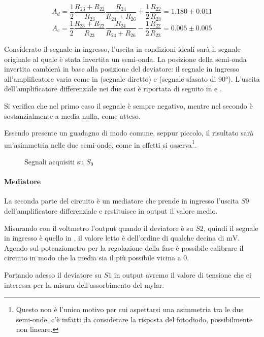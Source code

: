 $$A_d = \frac{1}{2}\frac{R_{23}+R_{22}}{R_{23}}\frac{R_{24}}{R_{24}+R_{26}} + \frac{1}{2}\frac{R_{22}}{R_{23}} = 1.180\pm0.011$$
$$A_c = \frac{1}{2}\frac{R_{23}+R_{22}}{R_{23}}\frac{R_{24}}{R_{24}+R_{26}} - \frac{1}{2}\frac{R_{22}}{R_{23}} = 0.005\pm0.005$$

Considerato il segnale in ingresso, l'uscita in condizioni ideali sarà il segnale originale al quale è stata invertita un semi-onda. La posizione della semi-onda invertita cambierà in base alla posizione del deviatore: il segnale in ingresso all'amplificatore varia come in  (segnale diretto) e  (segnale sfasato di 90°). L'uscita dell'amplificatore differenziale nei due casi è riportata di seguito in  e .

Si verifica che nel primo caso il segnale è sempre negativo, mentre nel secondo è sostanzialmente a media nulla, come atteso.

Essendo presente un guadagno di modo comune, seppur piccolo, il risultato sarà un'asimmetria nelle due semi-onde, come in effetti si osserva\footnote{Questo non è l'unico motivo per cui aspettarsi una asimmetria tra le due semi-onde, c'è infatti da considerare la risposta del fotodiodo, possibilmente non lineare.}.

\begin{figure}[h]
		\centering
		\caption{Segnali acquisiti su $S_9$}
		\label{fig:s7}
\end{figure}

\paragraph{Mediatore} La seconda parte del circuito è un mediatore che prende in ingresso l'uscita $S9$ dell'amplificatore differenziale e restituisce in output il valore medio.

Misurando con il voltmetro l'output quando il deviatore è su $S2$, quindi il segnale in ingresso è quello in , il valore letto è dell'ordine di qualche decina di $\si{\milli\volt}$. Agendo sul potenziometro per la regolazione della fase è possibile calibrare il circuito in modo che la media sia il più possibile vicina a 0.

Portando adesso il deviatore su $S1$ in output avremo il valore di tensione che ci interessa per la misura dell'assorbimento del mylar.

